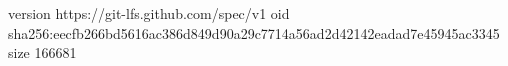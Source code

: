 version https://git-lfs.github.com/spec/v1
oid sha256:eecfb266bd5616ac386d849d90a29c7714a56ad2d42142eadad7e45945ac3345
size 166681
